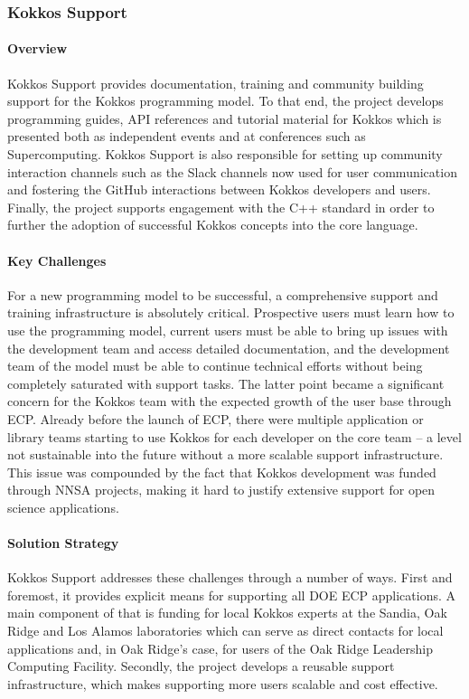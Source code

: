 \subsubsection{Kokkos Support} 

\paragraph{Overview} 
Kokkos Support provides documentation, training and community building support for the Kokkos programming model. 
To that end, the project develops programming guides, API references and tutorial material for Kokkos which is presented both as independent events and at conferences such as Supercomputing.
Kokkos Support is also responsible for setting up community interaction channels such as the Slack channels now used for user communication and fostering the GitHub interactions between Kokkos developers and users.
Finally, the project supports engagement with the C++ standard in order to further the adoption of successful Kokkos concepts into the core language. 

\paragraph{Key Challenges}
For a new programming model to be successful, a comprehensive support and training infrastructure is absolutely critical. 
Prospective users must learn how to use the programming model, current users must be able to bring up issues with the development team and access detailed documentation, and the development team of the model must be able to continue technical efforts without being completely saturated with support tasks. 
The latter point became a significant concern for the Kokkos team with the expected growth of the user base through ECP.  
Already before the launch of ECP, there were multiple application or library teams starting to use Kokkos for each developer on the core team -- a level not sustainable into the future without a more scalable support infrastructure. 
This issue was compounded by the fact that Kokkos development was funded through NNSA projects, making it hard to justify extensive support for open science applications. 

\paragraph{Solution Strategy}

Kokkos Support addresses these challenges through a number of ways. 
First and foremost, it provides explicit means for supporting all DOE ECP applications. 
A main component of that is funding for local Kokkos experts at the Sandia, Oak Ridge and Los Alamos laboratories which can serve as direct contacts for local applications and, in Oak Ridge's case, for users of the Oak Ridge Leadership Computing Facility. 
Secondly, the project develops a reusable support infrastructure, which makes supporting more users scalable and cost effective. 


